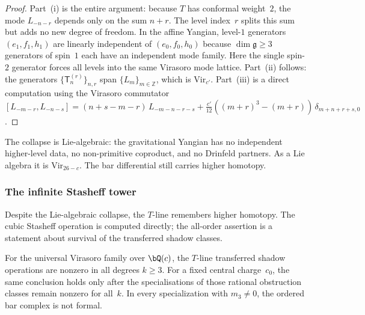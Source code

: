 \begin{proof}
Part~(i) is the entire argument: because $T$ has conformal weight~$2$,
the mode $L_{-n-r}$ depends only on the sum $n+r$. The level
index~$r$ splits this sum but adds no new degree of freedom. In the
affine Yangian, level-$1$ generators $(e_1, f_1, h_1)$ are linearly
independent of $(e_0, f_0, h_0)$ because $\dim\mathfrak{g} \ge 3$
generators of spin~$1$ each have an independent mode family. Here
the single spin-$2$ generator forces all levels into the same
Virasoro mode lattice.
Part~(ii) follows: the generators $\{\mathsf{T}_n^{(r)}\}_{n,r}$
span $\{L_m\}_{m \in \mathbb{Z}}$, which is $\mathrm{Vir}_{c'}$.
Part~(iii) is a direct computation using the Virasoro commutator
$[L_{-m-r}, L_{-n-s}] = (n{+}s{-}m{-}r)\,L_{-m-n-r-s}
+ \frac{c'}{12}((m{+}r)^3 - (m{+}r))\,\delta_{m+n+r+s,0}$.
\end{proof}

The collapse is Lie-algebraic: the gravitational Yangian has no
independent higher-level data, no non-primitive coproduct, and no
Drinfeld partners. As a Lie algebra it is $\mathrm{Vir}_{26-c}$.
The bar differential still carries higher homotopy.

\subsubsection*{The infinite Stasheff tower}

Despite the Lie-algebraic collapse, the $T$-line remembers higher
homotopy. The cubic Stasheff operation is computed directly; the
all-order assertion is a statement about survival of the transferred
shadow classes.

\begin{theorem}
\label{thm:vir-non-formality}
For the universal Virasoro family over $\bQ(c)$, the $T$-line
transferred shadow operations are nonzero in all degrees
$k\ge3$. For a fixed central charge~$c_0$, the same conclusion holds
only after the specialisations of those rational obstruction classes
remain nonzero for all~$k$. In every specialization with
$m_3\neq0$, the ordered bar complex is not formal.
\end{theorem}

